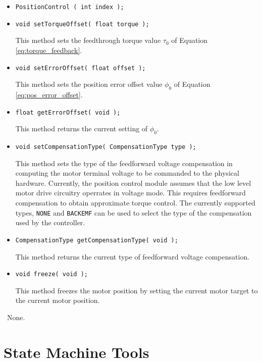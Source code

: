 \constructors

\begin{itemize}
\item{\tt PositionControl ( int index ); }
\end{itemize}

\localinterface

\begin{itemize}
\item{\tt void setTorqueOffset( float torque );}\par
This method sets the feedthrough torque value $\tau_0$ of Equation
\ref{eq:torque_feedback}.

\item{\tt void setErrorOffset( float offset );}\par
This method sets the position error offset value $\phi_0$ of Equation
\ref{eq:pos_error_offset}.

\item{\tt float getErrorOffset( void );}\par
This method returns the current setting of $\phi_0$.

\item{\tt void setCompensationType( CompensationType type );}\par
This method sets the type of the feedforward voltage compensation in
computing the motor terminal voltage to be commanded to the physical
hardware. Currently, the position control module assumes that the low level
motor drive circuitry operrates in voltage mode. This requires feedforward
compensation to obtain approximate torque control. The currently supported
types, {\tt NONE} and {\tt BACKEMF} can be used to select the type of the
compensation used by the controller.

\item{\tt CompensationType getCompensationType( void );}\par
This method returns the current type of feedforward voltage compensation.

\item{\tt void freeze( void );}\par
This method freezes the motor position by setting the current motor target 
to the current motor position.
\end{itemize}

\configsymbols\ None.

\section{State Machine Tools}

